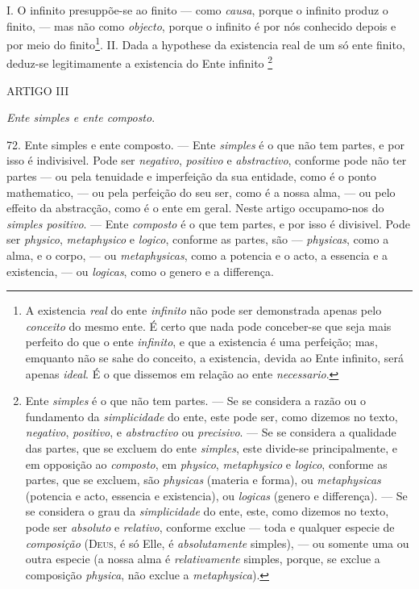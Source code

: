 I. O infinito presuppõe-se ao finito --- como \emph{causa}, porque o infinito produz o finito, --- mas não como \emph{objecto}, porque o infinito é por nós conhecido depois e por meio do finito\footnote{A existencia \emph{real} do ente \emph{infinito} não pode ser demonstrada apenas pelo \emph{conceito} do mesmo ente. É certo que nada pode conceber-se que seja mais perfeito do que o ente \emph{infinito}, e que a existencia é uma perfeição; mas, emquanto não se sahe do conceito, a existencia, devida ao Ente infinito, será apenas \emph{ideal}. É o que dissemos em relação ao ente \emph{necessario}.}.
 II. Dada a hypothese da existencia real de um só ente finito, deduz-se legitimamente a existencia do Ente infinito \footnote{Ente \emph{simples} é o que não tem partes. --- Se se considera a razão ou o fundamento da \emph{simplicidade} do ente, este pode ser, como dizemos no texto, \emph{negativo}, \emph{positivo}, e \emph{abstractivo} ou \emph{precisivo}. --- Se se considera a qualidade das partes, que se excluem do ente \emph{simples}, este divide-se principalmente, e em opposição ao \emph{composto}, em \emph{physico}, \emph{metaphysico} e \emph{logico}, conforme as partes, que se excluem, são \emph{physicas} (materia e forma), ou \emph{metaphysicas} (potencia e acto, essencia e existencia), ou \emph{logicas} (genero e differença). --- Se se considera o grau da \emph{simplicidade} do ente, este, como dizemos no texto, pode ser \emph{absoluto} e \emph{relativo}, conforme exclue --- toda e qualquer especie de \emph{composição} (\textsc{Deus}, é só Elle, é \emph{absolutamente} simples), --- ou somente uma ou outra especie (a nossa alma é \emph{relativamente} simples, porque, se exclue a composição \emph{physica}, não exclue a \emph{metaphysica}).}

ARTIGO III

\emph{Ente simples e ente composto}.

72. Ente simples e ente composto. --- Ente \emph{simples} é o que não tem partes, e por isso é indivisivel. Pode ser \emph{negativo}, \emph{positivo} e \emph{abstractivo}, conforme pode não ter partes --- ou pela tenuidade e imperfeição da sua entidade, como é o ponto mathematico, --- ou pela perfeição do seu ser, como é a nossa alma, --- ou pelo effeito da abstracção, como é o ente em geral. Neste artigo occupamo-nos do \emph{simples positivo}. --- Ente \emph{composto} é o que tem partes, e por isso é divisivel. Pode ser \emph{physico}, \emph{metaphysico} e \emph{logico}, conforme as partes, são --- \emph{physicas}, como a alma, e o corpo, --- ou \emph{metaphysicas}, como a potencia e o acto, a essencia e a existencia, --- ou \emph{logicas}, como o genero e a differença.


